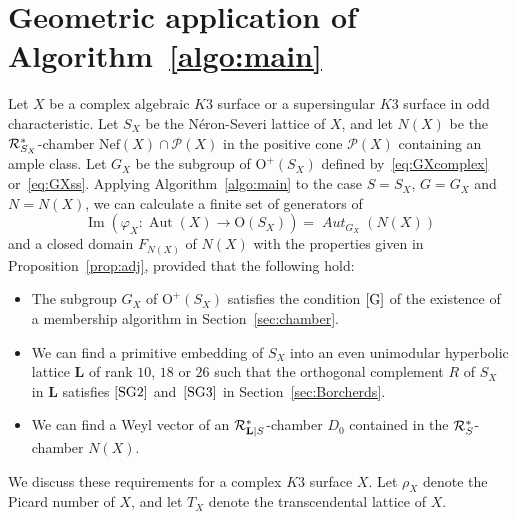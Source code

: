 \documentclass{amsart}
\theoremstyle{plain}
\theoremstyle{definition}
\theoremstyle{remark}
\numberwithin{equation}{section}
\numberwithin{table}{section}
\numberwithin{figure}{section}
\newcommand{\PPP}{\mathord{\mathcal P}}
\newcommand{\RRR}{\mathord{\mathcal R}}
\newcommand{\OG}{\mathord{\mathrm {O}}}
\newcommand{\Image}{\operatorname{\mathrm {Im}}\nolimits}
\newcommand{\Aut}{\operatorname{\mathrm {Aut}}\nolimits}
\renewcommand{\L}{\mathord{\mathbf{L}}}
\newcommand{\Nef}{\mathord{\mathrm{Nef}}}
\newcommand{\aut}{\operatorname{\mathit {Aut}}\nolimits}
\newcommand{\Roots}{\RRR}
\newcommand{\sphyp}{\sp*}
\newcommand{\RtsLS}{\Roots_{\L|S}}
\newcommand{\Nc}{N}
\newcommand{\propVG}{\mathord{\rm [G]}}
\newcommand{\assumptwo}{\mathord{\rm [SG2]}}
\newcommand{\assumpthree}{\mathord{\rm [SG3]}}
\begin{document}
\section{Geometric application of Algorithm~\ref{algo:main}}\label{sec:geometricapplication}
%
%
Let $X$ be a complex algebraic $K3$ surface or a supersingular $K3$ surface in
odd characteristic.
Let $S_X$ be the N\'eron-Severi lattice of $X$,
and let $\Nc(X)$ be the $\Roots_{S_X}\sphyp$-chamber $\Nef(X)\cap \PPP(X)$
in the positive cone $\PPP(X)$ containing an ample class.
Let $G_X$ be the subgroup of $\OG^+(S_X)$ defined by~\eqref{eq:GXcomplex} or~\eqref{eq:GXss}.
Applying Algorithm~\ref{algo:main}
to the case $S=S_X$, $G=G_X$ and $\Nc=\Nc(X)$, 
we can calculate a finite set of generators of 
$$
\Image(\varphi_X\colon \Aut(X)\to \OG(S_X))=\aut_{G_X}(N (X))
$$
and %
a closed domain $F_{\Nc(X)}$ of $\Nc(X)$ with the properties given in Proposition~\ref{prop:adj}, 
provided that the following hold:
%
\begin{itemize}
\item[(1)] 
The subgroup $G_X$ of $\OG^+(S_X)$ satisfies  
the condition $\propVG$ of the existence of a membership algorithm 
in Section~\ref{sec:chamber}.
\item [(2)]
We can find a primitive embedding of  $S_X$
into an even unimodular  hyperbolic lattice $\L$ of rank $10$, $18$ or $26$
such that the orthogonal complement $R$ of $S_X$ in $\L$ 
satisfies $\assumptwo$ and~$\assumpthree$  in Section~\ref{sec:Borcherds}. 
\item[(3)]
 We can find a Weyl vector of an $\RtsLS\sphyp$-chamber $D_0$
contained in the $\Roots_{S}\sphyp$-chamber $\Nc(X)$.
\end{itemize}
%
%
%
We discuss  these requirements for a complex $K3$ surface $X$.
Let $\rho_X$ denote the Picard number of $X$,
and let $T_X$ denote the transcendental lattice of $X$.
%
\par
%
\end{document}
